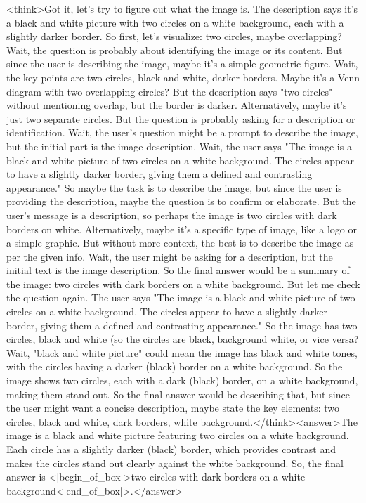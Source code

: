 <think>Got it, let's try to figure out what the image is. The description says it's a black and white picture with two circles on a white background, each with a slightly darker border. So first, let's visualize: two circles, maybe overlapping? Wait, the question is probably about identifying the image or its content. But since the user is describing the image, maybe it's a simple geometric figure. Wait, the key points are two circles, black and white, darker borders. Maybe it's a Venn diagram with two overlapping circles? But the description says "two circles" without mentioning overlap, but the border is darker. Alternatively, maybe it's just two separate circles. But the question is probably asking for a description or identification. Wait, the user's question might be a prompt to describe the image, but the initial part is the image description. Wait, the user says "The image is a black and white picture of two circles on a white background. The circles appear to have a slightly darker border, giving them a defined and contrasting appearance." So maybe the task is to describe the image, but since the user is providing the description, maybe the question is to confirm or elaborate. But the user's message is a description, so perhaps the image is two circles with dark borders on white. Alternatively, maybe it's a specific type of image, like a logo or a simple graphic. But without more context, the best is to describe the image as per the given info. Wait, the user might be asking for a description, but the initial text is the image description. So the final answer would be a summary of the image: two circles with dark borders on a white background. But let me check the question again. The user says "The image is a black and white picture of two circles on a white background. The circles appear to have a slightly darker border, giving them a defined and contrasting appearance." So the image has two circles, black and white (so the circles are black, background white, or vice versa? Wait, "black and white picture" could mean the image has black and white tones, with the circles having a darker (black) border on a white background. So the image shows two circles, each with a dark (black) border, on a white background, making them stand out. So the final answer would be describing that, but since the user might want a concise description, maybe state the key elements: two circles, black and white, dark borders, white background.</think><answer>The image is a black and white picture featuring two circles on a white background. Each circle has a slightly darker (black) border, which provides contrast and makes the circles stand out clearly against the white background.  
So, the final answer is <|begin_of_box|>two circles with dark borders on a white background<|end_of_box|>.</answer>
